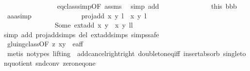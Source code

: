 \begin{isabellebody}
\ \ \ \ \ \ \ \ \ \ \ \ \ \ \isamarkupfalse%
\ eq{\isacharunderscore}class{\isacharunderscore}simp{\isacharbrackleft}OF\ assms{\isacharparenleft}{}{\isacharparenright}{\isacharbrackright}\ \isamarkupfalse%
\ {\isacharparenleft}simp\ add{\isacharcolon}\ {\isachardoublequoteopen}{}{\isachardoublequoteclose}{\isacharparenleft}{}{\isacharparenright}{\isacharparenright}\isanewline
\ \ \ \ \ \ \ \ \ \ \ \ \isamarkupfalse%
\ this\ bbb\ \isamarkupfalse%
\ aaa{\isacharunderscore}simp{\isacharcolon}\isanewline
\ \ \ \ \ \ \ \ \ \ \ \ \ \ {\isachardoublequoteopen}proj{\isacharunderscore}add\ {\isacharparenleft}{\isacharparenleft}x{\isacharcomma}\ y{\isacharparenright}{\isacharcomma}\ l{\isacharparenright}\ {\isacharparenleft}{\isasymtau}\ {\isacharparenleft}x{\isacharprime}{\isacharcomma}\ y{\isacharprime}{\isacharparenright}{\isacharcomma}\ l{\isacharprime}\ {\isacharplus}\ {}{\isacharparenright}\ {\isacharequal}\ \isanewline
\ \ \ \ \ \ \ \ \ \ \ \ \ \ \ Some\ {\isacharparenleft}ext{\isacharunderscore}add\ {\isacharparenleft}x{\isacharcomma}\ y{\isacharparenright}\ {\isacharparenleft}{\isasymtau}\ {\isacharparenleft}x{\isacharprime}{\isacharcomma}\ y{\isacharprime}{\isacharparenright}{\isacharparenright}{\isacharcomma}\ l{\isacharplus}l{\isacharprime}{\isacharplus}{}{\isacharparenright}{\isachardoublequoteclose}\ \isanewline
\ \ \ \ \ \ \ \ \ \ \ \ \ \ \isamarkupfalse%
{\isacharparenleft}simp\ add{\isacharcolon}\ proj{\isacharunderscore}add{\isachardot}simps\ del{\isacharcolon}\ ext{\isacharunderscore}add{\isachardot}simps\ {\isasymtau}{\isachardot}simps{\isacharcomma}safe{\isacharparenright}\ \isanewline
\ \ \ \ \ \ \ \ \ \ \ \ \ \ \isamarkupfalse%
\ gluing{\isacharunderscore}class{\isacharbrackleft}OF\ z{}\ {\isacartoucheopen}{\isacharparenleft}x{\isacharcomma}y{\isacharparenright}\ {\isasymin}\ e{\isacharunderscore}aff{\isacartoucheclose}{\isacharbrackright}\ \isanewline
\ \ \ \ \ \ \ \ \ \ \ \ \ \ \isamarkupfalse%
\ {\isacharparenleft}metis\ {\isacharparenleft}no{\isacharunderscore}types{\isacharcomma}\ lifting{\isacharparenright}\ {\isachardoublequoteopen}{}{\isachardoublequoteclose}{\isacharparenleft}{}{\isacharparenright}\ add{\isacharunderscore}cancel{\isacharunderscore}right{\isacharunderscore}right\ doubleton{\isacharunderscore}eq{\isacharunderscore}iff\ insert{\isacharunderscore}absorb{}\ singleton{\isacharunderscore}quotient\ snd{\isacharunderscore}conv\ zero{\isacharunderscore}neq{\isacharunderscore}one{\isacharparenright}\isanewline

\end{isabellebody}
